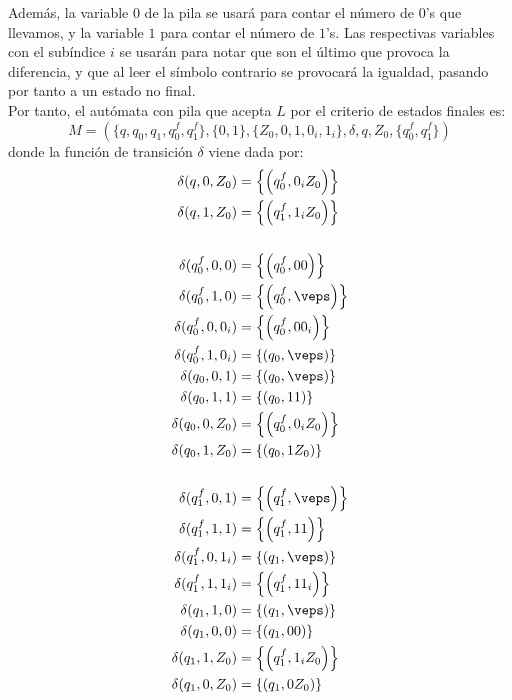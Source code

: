 \documentclass[12pt]{article}
\begin{document}
\begin{ejercicio}[2.5 puntos]
        Además, la variable $0$ de la pila se usará para contar el número de $0$'s que llevamos, y la variable $1$ para contar el número de $1$'s. Las respectivas variables con el subíndice $i$ se usarán para notar que son el último que provoca la diferencia, y que al leer el símbolo contrario se provocará la igualdad, pasando por tanto a un estado no final.\\
        Por tanto, el autómata con pila que acepta $L$ por el criterio de estados finales es:
        \begin{equation*}
            M=(\{q,q_0,q_1,q_0^f,q_1^f\},\{0,1\},\{Z_0,0,1,0_i,1_i\},\delta,q,Z_0,\{q_0^f,q_1^f\})
        \end{equation*}
        donde la función de transición $\delta$ viene dada por:
        \begin{align*}
            \delta(q,0,Z_0)&=\left\{\left(q_0^f,0_iZ_0\right)\right\}\\
            \delta(q,1,Z_0)&=\left\{\left(q_1^f,1_iZ_0\right)\right\}\\ \\
            \delta(q_0^f,0,0)&=\left\{\left(q_0^f,00\right)\right\}\\
            \delta(q_0^f,1,0)&=\left\{\left(q_0^f,\veps\right)\right\}\\
            \delta(q_0^f,0,0_i)&=\left\{\left(q_0^f,00_i\right)\right\}\\
            \delta(q_0^f,1,0_i)&=\left\{\left(q_0,\veps\right)\right\}\\
            \delta(q_0,0,1)&=\left\{\left(q_0,\veps\right)\right\}\\
            \delta(q_0,1,1)&=\left\{\left(q_0,11\right)\right\}\\
            \delta(q_0,0,Z_0)&=\left\{\left(q_0^f,0_iZ_0\right)\right\}\\
            \delta(q_0,1,Z_0)&=\left\{\left(q_0,1Z_0\right)\right\}\\ \\
            \delta(q_1^f,0,1)&=\left\{\left(q_1^f,\veps\right)\right\}\\
            \delta(q_1^f,1,1)&=\left\{\left(q_1^f,11\right)\right\}\\
            \delta(q_1^f,0,1_i)&=\left\{\left(q_1,\veps\right)\right\}\\
            \delta(q_1^f,1,1_i)&=\left\{\left(q_1^f,11_i\right)\right\}\\
            \delta(q_1,1,0)&=\left\{\left(q_1,\veps\right)\right\}\\
            \delta(q_1,0,0)&=\left\{\left(q_1,00\right)\right\}\\
            \delta(q_1,1,Z_0)&=\left\{\left(q_1^f,1_iZ_0\right)\right\}\\
            \delta(q_1,0,Z_0)&=\left\{\left(q_1,0Z_0\right)\right\}
        \end{align*}


\end{ejercicio}
\end{document}
